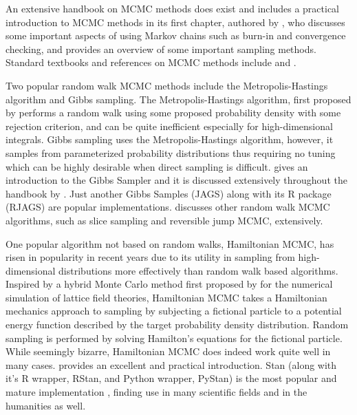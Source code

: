An extensive handbook on MCMC methods does exist \citep{Brooks11} and includes a practical introduction to MCMC methods in its first chapter, authored by \citet{Geyer11}, who discusses some important aspects of using Markov chains such as burn-in and convergence checking, and provides an overview of some important sampling methods. Standard textbooks and references on MCMC methods include \citet{Gilks95} and \citet{Christian99}.

Two popular random walk MCMC methods include the Metropolis-Hastings algorithm and Gibbs sampling. The Metropolis-Hastings algorithm, first proposed by \citet{Metropolis53} performs a random walk using some proposed probability density with some rejection criterion, and can be quite inefficient especially for high-dimensional integrals. Gibbs sampling uses the Metropolis-Hastings algorithm, however, it samples from parameterized probability distributions thus requiring no tuning which can be highly desirable when direct sampling is difficult. \citet{Casella92} gives an introduction to the Gibbs Sampler and it is discussed extensively throughout the handbook by \citet{Brooks11}. Just another Gibbs Samples (JAGS) \citep{Plummer03} along with its R package (RJAGS) are popular implementations. \citet{Brooks11} discusses other random walk MCMC algorithms, such as slice sampling and reversible jump MCMC, extensively.

One popular algorithm not based on random walks, Hamiltonian MCMC, has risen in popularity in recent years due to its utility in sampling from high-dimensional distributions more effectively than random walk based algorithms. Inspired by a hybrid Monte Carlo method first proposed by \citet{Duane87} for the numerical simulation of lattice field theories, Hamiltonian MCMC takes a Hamiltonian mechanics approach to sampling by subjecting a fictional particle to a potential energy function described by the target probability density distribution. Random sampling is performed by solving Hamilton's equations for the fictional particle. While seemingly bizarre, Hamiltonian MCMC does indeed work quite well in many cases. \citet{Neal11} provides an excellent and practical introduction. Stan (along with it's R wrapper, RStan, and Python wrapper, PyStan) is the most popular and mature implementation \citep{Carpenter17}, finding use in many scientific fields and in the humanities as well.


